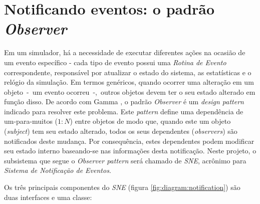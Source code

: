 \section{\label{sec:model:notify}Notificando eventos: o padrão
\textit{Observer}}

Em um simulador, há a necessidade de executar diferentes ações na ocasião de um
evento específico - cada tipo de evento possui uma \textit{Rotina de Evento}
correspondente, responsável por atualizar o estado do sistema, as estatísticas e
o relógio da simulação. Em termos genéricos, quando ocorrer uma alteração em um
objeto~-~um evento ocorreu~-,~outros objetos devem ter o seu estado alterado em
função disso. De acordo com Gamma \cite{Gamma:1995:DPE:186897}, o padrão
\textit{Observer} é um \textit{design pattern} indicado para resolver este
problema. Este \textit{pattern} define uma dependência de um-para-muitos ($1:N$)
entre objetos de modo que, quando este um objeto (\textit{subject}) tem seu
estado alterado, todos os seus dependentes (\textit{observers}) são notificados
deste mudança. Por consequência, estes dependentes podem modificar seu estado
interno baseando-se nas informações desta notificação. Neste projeto, o
subsistema que segue o \textit{Observer pattern} será chamado de \textit{SNE},
acrônimo para \textit{Sistema de Notificação de Eventos}.

Os três principais componentes do \textit{SNE} (figura
\ref{fig:diagram:notification}) são duas interfaces e uma classe:

